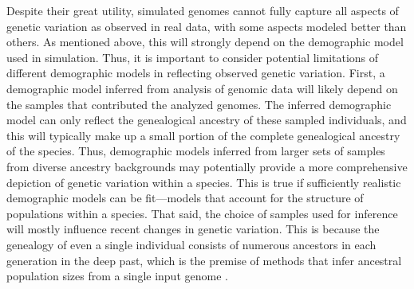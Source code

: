 \documentclass[hidelinks]{article}
\begin{document}
Despite their great utility, simulated genomes cannot fully
capture all aspects of genetic variation as observed in real data,
with some aspects modeled better than others.
As mentioned above, this will strongly depend on the demographic model used in simulation.
Thus, it is important to consider potential limitations of different demographic models
in reflecting observed genetic variation.
First, a demographic model inferred from analysis of genomic data will likely depend on
the samples that contributed the analyzed genomes.
The inferred demographic model can only reflect the genealogical ancestry
of these sampled individuals, and this will typically make up a small portion
of the complete genealogical ancestry of the species.
Thus, demographic models inferred from larger sets of samples from diverse ancestry backgrounds
may potentially provide a more comprehensive depiction of genetic variation within a species.
This is true if sufficiently realistic demographic models can be fit---models that account for the structure of populations within a species.
That said, the choice of samples used for inference will mostly influence
recent changes in genetic variation.
This is because the genealogy of even a single individual consists of numerous ancestors
in each generation in the deep past,
which is the premise of methods that infer ancestral population sizes from a single input genome
\citep{LiDurbin2011}.
\end{document}
